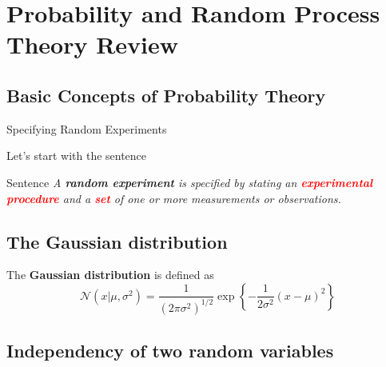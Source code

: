 \section{Probability and Random Process Theory Review}
\framecard{\insertsection}
\subsection{Basic Concepts of Probability Theory}


\begin{frame}{Specifying Random Experiments}

Let's start with the sentence

\begin{block}{Sentence}
\textit{A \textbf{random experiment} is specified by stating an \textbf{\textcolor{red}{experimental procedure}} and a \textbf{\textcolor{red}{set}} of one or more measurements or observations.}
\end{block}

\end{frame}

\subsection{The Gaussian distribution}
\begin{frame}{\insertsubsection}
The \textbf{Gaussian distribution} is defined as
	\begin{equation}\label{eq:gaussian-distribution}
	\mathcal{N}(x|\mu,\sigma^2) = \frac{1}{(2\pi\sigma^2)^{1/2}}\exp\left\{-\frac{1}{2\sigma^2}(x-\mu)^2\right\}
	\end{equation}
\end{frame}


\subsection{Independency of two random variables}
\begin{frame}{\insertsubsection}
\end{frame}

